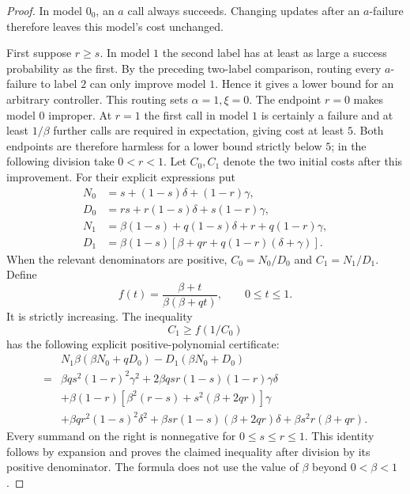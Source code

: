 \begin{proof}
In model $0_0$, an $a$ call always succeeds.  Changing updates after
an $a$-failure therefore leaves this model's cost unchanged.

First suppose $r\ge s$.  In model $1$ the second label has at least
as large a success probability as the first.  By the preceding
two-label comparison, routing every $a$-failure to label $2$ can
only improve model $1$.  Hence it gives a lower bound for an
arbitrary controller.  This routing sets $\alpha=1,\xi=0$.
The endpoint $r=0$ makes model $0$ improper.  At $r=1$ the first
call in model $1$ is certainly a failure and at least $1/\beta$
further calls are required in expectation, giving cost at least
$5$.  Both endpoints are therefore harmless for a lower bound
strictly below $5$; in the following division take $0<r<1$.
Let $C_0,C_1$ denote the two initial costs after this improvement.
For their explicit expressions put
\begin{align*}
 N_0&=s+(1-s)\delta+(1-r)\gamma,\\
 D_0&=rs+r(1-s)\delta+s(1-r)\gamma,\\
 N_1&=\beta(1-s)+q(1-s)\delta+r+q(1-r)\gamma,\\
 D_1&=\beta(1-s)
            [\beta+qr+q(1-r)(\delta+\gamma)].
\end{align*}
When the relevant denominators are positive,
$C_0=N_0/D_0$ and $C_1=N_1/D_1$.  Define
\begin{equation}\label{eq:r80-comparison-function}
 f(t)=\frac{\beta+t}{\beta(\beta+qt)},\qquad 0\le t\le1.
\end{equation}
It is strictly increasing.  The inequality
\begin{equation}\label{eq:r80-palette-comparison}
 C_1\ge f(1/C_0)
\end{equation}
has the following explicit positive-polynomial certificate:
\begin{align}
 &N_1\beta(\beta N_0+qD_0)
               -D_1(\beta N_0+D_0) \nonumber\\
 ={}&\beta q s^2(1-r)^2\gamma^2
       +2\beta qsr(1-s)(1-r)\gamma\delta \nonumber\\
 &+\beta(1-r)
      [\beta^2(r-s)+s^2(\beta+2qr)]\gamma \nonumber\\
 &+\beta q r^2(1-s)^2\delta^2
       +\beta sr(1-s)(\beta+2qr)\delta
       +\beta s^2r(\beta+qr).
       \label{eq:r80-positive-polynomial}
\end{align}
Every summand on the right is nonnegative for $0\le s\le r\le1$.
This identity follows by expansion and proves the claimed inequality
after division by its positive denominator.  The formula does not
use the value of $\beta$ beyond $0<\beta<1$.


\end{proof}
